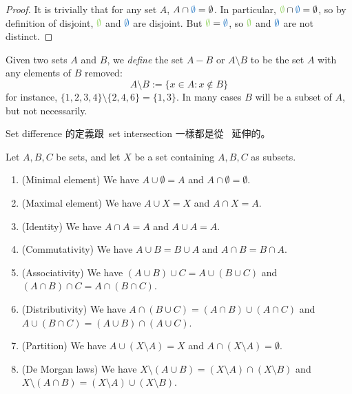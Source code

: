 \begin{proof}
It is trivially that for any set \(A\), \(A \cap \BLUE{\emptyset} = \emptyset\). In particular, \(\GREEN{\emptyset} \cap \BLUE{\emptyset} = \emptyset\), so by definition of disjoint, \(\GREEN{\emptyset}\) and \(\BLUE{\emptyset}\) are disjoint. But \(\GREEN{\emptyset} = \BLUE{\emptyset}\), so \(\GREEN{\emptyset}\) and \(\BLUE{\emptyset}\) are not distinct.
\end{proof}

\begin{definition}  \label{def 3.1.27}
Given two sets \(A\) and \(B\), we \emph{define} the set \(A − B\) or \(A \setminus B\) to be the set \(A\) with any elements of \(B\) removed:
\[
A \setminus B := \{ x \in A : x \notin B \}
\]
for instance, \( \{ 1, 2, 3, 4 \} \setminus \{ 2, 4, 6 \}  = \{ 1, 3 \} \). In many cases \(B\) will be a subset of \(A\), but not necessarily.
\end{definition}

\begin{note}
Set difference 的定義跟\ set intersection 一樣都是從\  延伸的。
\end{note}

\begin{proposition}  \label{prop 3.1.28} 
Let \(A, B, C\) be sets, and let \(X\) be a set containing \(A, B, C\) as subsets.
\begin{enumerate}
    \item (Minimal element) We have \(A \cup \emptyset = A\) and \(A \cap \emptyset = \emptyset\).
    \item (Maximal element) We have \(A \cup X = X\) and \(A \cap X = A\).
    \item (Identity) We have \(A \cap A = A\) and \(A \cup A = A\).
    \item (Commutativity) We have \(A \cup B = B \cup A\) and \(A \cap B = B \cap A\).
    \item (Associativity) We have \((A \cup B) \cup C = A \cup (B \cup C)\) and \((A \cap B) \cap C = A \cap (B \cap C)\).
    \item (Distributivity) We have \(A \cap (B \cup C) = (A \cap B) \cup (A \cap C)\) and \(A \cup (B \cap C) = (A \cup B) \cap (A \cup C)\).
    \item (Partition) We have \(A \cup (X \setminus A) = X\) and \(A \cap (X \setminus A) = \emptyset\).
    \item (De Morgan laws) We have \(X \setminus (A \cup B) = (X \setminus A) \cap (X \setminus B) \) and \(X \setminus (A \cap B) = (X \setminus A) \cup (X \setminus B)\).
\end{enumerate}
\end{proposition}

